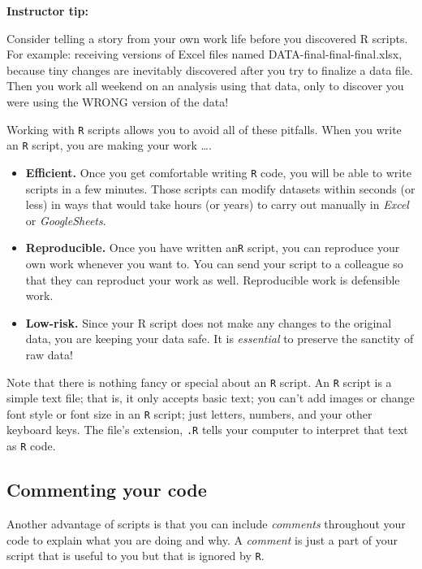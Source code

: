 \documentclass[
]{book}
\begin{document}
\leavevmode{}%
\textbf{Instructor tip:}

Consider telling a story from your own work life before you discovered R scripts. For example: receiving versions of Excel files named DATA-final-final-final.xlsx, because tiny changes are inevitably discovered after you try to finalize a data file. Then you work all weekend on an analysis using that data, only to discover you were using the WRONG version of the data!

Working with \texttt{R} scripts allows you to avoid all of these pitfalls. When you write an \texttt{R} script, you are making your work \ldots.

\begin{itemize}
\item
  \textbf{Efficient.} Once you get comfortable writing \texttt{R} code, you will be able to write scripts in a few minutes. Those scripts can modify datasets within seconds (or less) in ways that would take hours (or years) to carry out manually in \emph{Excel} or \emph{GoogleSheets}.
\item
  \textbf{Reproducible.} Once you have written an\texttt{R} script, you can reproduce your own work whenever you want to. You can send your script to a colleague so that they can reproduct your work as well. Reproducible work is defensible work.
\item
  \textbf{Low-risk.} Since your R script does not make any changes to the original data, you are keeping your data safe. It is \emph{essential} to preserve the sanctity of raw data!
\end{itemize}

Note that there is nothing fancy or special about an \texttt{R} script. An \texttt{R} script is a simple text file; that is, it only accepts basic text; you can't add images or change font style or font size in an \texttt{R} script; just letters, numbers, and your other keyboard keys. The file's extension, \texttt{.R} tells your computer to interpret that text as \texttt{R} code.

\hypertarget{commenting-your-code}{%
\subsection*{Commenting your code}\label{commenting-your-code}}

Another advantage of scripts is that you can include \emph{comments} throughout your code to explain what you are doing and why. A \emph{comment} is just a part of your script that is useful to you but that is ignored by \texttt{R}.
\end{document}
